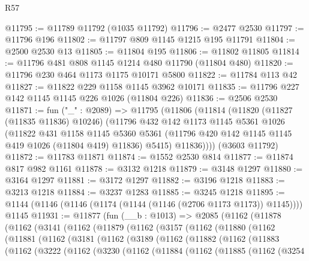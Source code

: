 \begin{lexlean}{R57}
\begin{coremodule}
@11795 := @11789 @11792 (@1035 @11792)
@11796 := @2477 @2530
@11797 := @11796 @196
@11802 := @11797 @809 @1145 @1215 @195 @11791
@11804 := @2500 @2530 @13
@11805 := @11804 @195
@11806 := @11802 @11805
@11814 := @11796 @481 @808 @1145 @1214 @480 @11790 (@11804 @480)
@11820 := @11796 @230 @464 @1173 @1175 @10171 @5800
@11822 := @11784 @113 @42
@11827 := @11822 @229 @1158 @1145 @3962 @10171
@11835 := @11796 @227 @142 @1145 @1145 @226 @1026 (@11804 @226)
@11836 := @2506 @2530
@11871 := fun ("_" : @2089) =>
  @11795
    (@11806
      (@11814
        (@11820
          (@11827 (@11835 @11836) @10246)
          (@11796
            @432
            @142
            @1173
            @1145
            @5361
            @1026
            (@11822
              @431
              @1158
              @1145
              @5360
              @5361
              (@11796 @420 @142 @1145 @1145 @419 @1026 (@11804 @419) @11836)
              @5415)
            @11836))))
    (@3603 @11792)
@11872 := @11783 @11871
@11874 := @1552 @2530 @814
@11877 := @11874 @817 @982 @1161
@11878 := @3132 @1218
@11879 := @3148 @1297
@11880 := @3164 @1297
@11881 := @3172 @1297
@11882 := @3196 @1218
@11883 := @3213 @1218
@11884 := @3237 @1283
@11885 := @3245 @1218
@11895 := @1144 (@1146 (@1146 (@1174 (@1144 (@1146 (@2706 @1173 @1173)) @1145)))) @1145
@11931 := @11877
    (fun (__b : @1013) =>
    @2085
      (@1162
        (@11878
          (@1162
            (@3141
              (@1162
                (@11879
                  (@1162
                    (@3157
                      (@1162
                        (@11880
                          (@1162
                            (@11881
                              (@1162
                                (@3181
                                  (@1162
                                    (@3189
                                      (@1162
                                        (@11882
                                          (@1162
                                            (@11883
                                              (@1162
                                                (@3222
                                                  (@1162
                                                    (@3230
                                                      (@1162
                                                        (@11884
                                                          (@1162
                                                            (@11885
                                                              (@1162
                                                                (@3254

\end{coremodule}
\end{lexlean}
